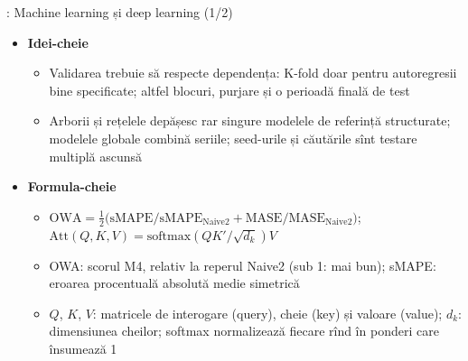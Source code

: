 \begin{frame}{: Machine learning și deep learning (1/2)}
\itemsize{\footnotesize}
\begin{itemize}
    \item \textbf{Idei-cheie}
    \begin{itemize}
        \item Validarea trebuie să respecte dependența: K-fold doar pentru autoregresii bine specificate; altfel blocuri, purjare și o perioadă finală de test
        \item Arborii și rețelele depășesc rar singure modelele de referință structurate; modelele globale combină seriile; seed-urile și căutările sînt testare multiplă ascunsă
    \end{itemize}
    \item \textbf{Formula-cheie}
    \begin{itemize}
        \item $\mathrm{OWA} = \frac12\big(\mathrm{sMAPE}/\mathrm{sMAPE}_{\mathrm{Naive2}} + \mathrm{MASE}/\mathrm{MASE}_{\mathrm{Naive2}}\big)$; $\mathrm{Att}(Q, K, V) = \mathrm{softmax}(QK'/\sqrt{d_k})V$
        \item OWA: scorul M4, relativ la reperul Naive2 (sub 1: mai bun); sMAPE: eroarea procentuală absolută medie simetrică
        \item $Q$, $K$, $V$: matricele de interogare (query), cheie (key) și valoare (value); $d_k$: dimensiunea cheilor; softmax normalizează fiecare rînd în ponderi care însumează 1
    \end{itemize}
\end{itemize}
\end{frame}

